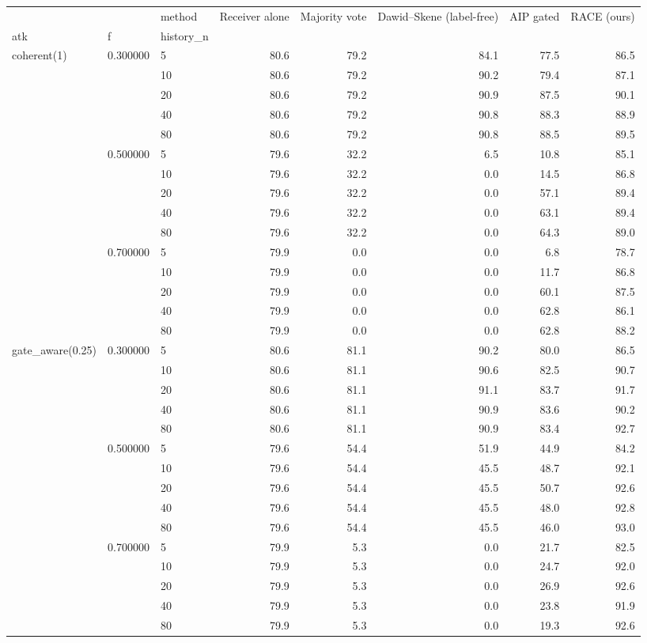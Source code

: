 \begin{tabular}{lllrrrrr}
\toprule
 &  & method & Receiver alone & Majority vote & Dawid–Skene (label-free) & AIP gated & RACE (ours) \\
atk & f & history\_n &  &  &  &  &  \\
\midrule
\multirow[t]{15}{*}{coherent(1)} & \multirow[t]{5}{*}{0.300000} & 5 & 80.6 & 79.2 & 84.1 & 77.5 & 86.5 \\
 &  & 10 & 80.6 & 79.2 & 90.2 & 79.4 & 87.1 \\
 &  & 20 & 80.6 & 79.2 & 90.9 & 87.5 & 90.1 \\
 &  & 40 & 80.6 & 79.2 & 90.8 & 88.3 & 88.9 \\
 &  & 80 & 80.6 & 79.2 & 90.8 & 88.5 & 89.5 \\
\cline{2-8}
 & \multirow[t]{5}{*}{0.500000} & 5 & 79.6 & 32.2 & 6.5 & 10.8 & 85.1 \\
 &  & 10 & 79.6 & 32.2 & 0.0 & 14.5 & 86.8 \\
 &  & 20 & 79.6 & 32.2 & 0.0 & 57.1 & 89.4 \\
 &  & 40 & 79.6 & 32.2 & 0.0 & 63.1 & 89.4 \\
 &  & 80 & 79.6 & 32.2 & 0.0 & 64.3 & 89.0 \\
\cline{2-8}
 & \multirow[t]{5}{*}{0.700000} & 5 & 79.9 & 0.0 & 0.0 & 6.8 & 78.7 \\
 &  & 10 & 79.9 & 0.0 & 0.0 & 11.7 & 86.8 \\
 &  & 20 & 79.9 & 0.0 & 0.0 & 60.1 & 87.5 \\
 &  & 40 & 79.9 & 0.0 & 0.0 & 62.8 & 86.1 \\
 &  & 80 & 79.9 & 0.0 & 0.0 & 62.8 & 88.2 \\
\cline{1-8} \cline{2-8}
\multirow[t]{15}{*}{gate\_aware(0.25)} & \multirow[t]{5}{*}{0.300000} & 5 & 80.6 & 81.1 & 90.2 & 80.0 & 86.5 \\
 &  & 10 & 80.6 & 81.1 & 90.6 & 82.5 & 90.7 \\
 &  & 20 & 80.6 & 81.1 & 91.1 & 83.7 & 91.7 \\
 &  & 40 & 80.6 & 81.1 & 90.9 & 83.6 & 90.2 \\
 &  & 80 & 80.6 & 81.1 & 90.9 & 83.4 & 92.7 \\
\cline{2-8}
 & \multirow[t]{5}{*}{0.500000} & 5 & 79.6 & 54.4 & 51.9 & 44.9 & 84.2 \\
 &  & 10 & 79.6 & 54.4 & 45.5 & 48.7 & 92.1 \\
 &  & 20 & 79.6 & 54.4 & 45.5 & 50.7 & 92.6 \\
 &  & 40 & 79.6 & 54.4 & 45.5 & 48.0 & 92.8 \\
 &  & 80 & 79.6 & 54.4 & 45.5 & 46.0 & 93.0 \\
\cline{2-8}
 & \multirow[t]{5}{*}{0.700000} & 5 & 79.9 & 5.3 & 0.0 & 21.7 & 82.5 \\
 &  & 10 & 79.9 & 5.3 & 0.0 & 24.7 & 92.0 \\
 &  & 20 & 79.9 & 5.3 & 0.0 & 26.9 & 92.6 \\
 &  & 40 & 79.9 & 5.3 & 0.0 & 23.8 & 91.9 \\
 &  & 80 & 79.9 & 5.3 & 0.0 & 19.3 & 92.6 \\
\cline{1-8} \cline{2-8}
\bottomrule
\end{tabular}
